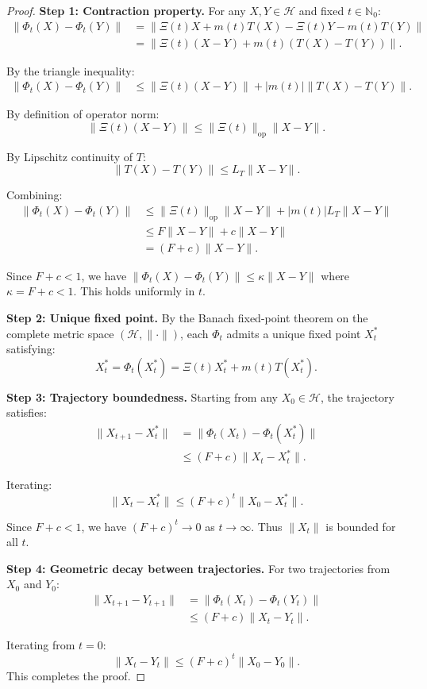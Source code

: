 \documentclass[11pt,a4paper]{article}
\begin{document}
\begin{proof}
\textbf{Step 1: Contraction property.}
For any \(X, Y \in \mathcal{H}\) and fixed \(t \in \mathbb{N}_0\):
\begin{align*}
\|\Phi_t(X) - \Phi_t(Y)\| 
&= \|\Xi(t)X + m(t)T(X) - \Xi(t)Y - m(t)T(Y)\| \\
&= \|\Xi(t)(X - Y) + m(t)(T(X) - T(Y))\|.
\end{align*}

By the triangle inequality:
\begin{align*}
\|\Phi_t(X) - \Phi_t(Y)\| 
&\leq \|\Xi(t)(X - Y)\| + |m(t)| \|T(X) - T(Y)\|.
\end{align*}

By definition of operator norm:
\[
\|\Xi(t)(X - Y)\| \leq \|\Xi(t)\|_{\mathrm{op}} \|X - Y\|.
\]

By Lipschitz continuity of \(T\):
\[
\|T(X) - T(Y)\| \leq L_T \|X - Y\|.
\]

Combining:
\begin{align*}
\|\Phi_t(X) - \Phi_t(Y)\| 
&\leq \|\Xi(t)\|_{\mathrm{op}} \|X - Y\| + |m(t)| L_T \|X - Y\| \\
&\leq F \|X - Y\| + c \|X - Y\| \\
&= (F + c) \|X - Y\|.
\end{align*}

Since \(F + c < 1\), we have \(\|\Phi_t(X) - \Phi_t(Y)\| \leq \kappa \|X - Y\|\) where \(\kappa = F + c < 1\). This holds uniformly in \(t\).

\textbf{Step 2: Unique fixed point.}
By the Banach fixed-point theorem on the complete metric space \((\mathcal{H}, \|\cdot\|)\), each \(\Phi_t\) admits a unique fixed point \(X_t^*\) satisfying:
\[
X_t^* = \Phi_t(X_t^*) = \Xi(t)X_t^* + m(t)T(X_t^*).
\]

\textbf{Step 3: Trajectory boundedness.}
Starting from any \(X_0 \in \mathcal{H}\), the trajectory satisfies:
\begin{align*}
\|X_{t+1} - X_t^*\| 
&= \|\Phi_t(X_t) - \Phi_t(X_t^*)\| \\
&\leq (F+c) \|X_t - X_t^*\|.
\end{align*}

Iterating:
\[
\|X_t - X_t^*\| \leq (F+c)^t \|X_0 - X_t^*\|.
\]

Since \(F+c < 1\), we have \((F+c)^t \to 0\) as \(t \to \infty\). Thus \(\|X_t\|\) is bounded for all \(t\).

\textbf{Step 4: Geometric decay between trajectories.}
For two trajectories from \(X_0\) and \(Y_0\):
\begin{align*}
\|X_{t+1} - Y_{t+1}\| 
&= \|\Phi_t(X_t) - \Phi_t(Y_t)\| \\
&\leq (F+c) \|X_t - Y_t\|.
\end{align*}

Iterating from \(t=0\):
\[
\|X_t - Y_t\| \leq (F+c)^t \|X_0 - Y_0\|.
\]
This completes the proof.
\end{proof}
\end{document}
